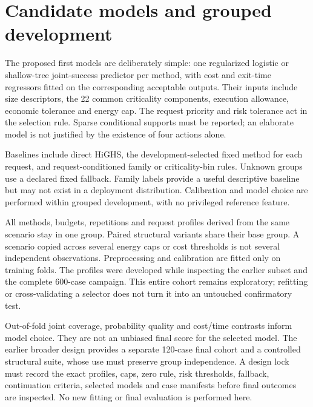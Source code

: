 
\section{Candidate models and grouped development}
The proposed first models are deliberately simple: one regularized logistic
or shallow-tree joint-success predictor per method, with cost and exit-time
regressors fitted on the corresponding acceptable outputs. Their inputs
include size descriptors, the 22 common criticality components, execution
allowance, economic tolerance and energy cap. The request priority and risk
tolerance act in the selection rule. Sparse conditional supports must be
reported; an elaborate model is not justified by the existence of four
actions alone.

Baselines include direct HiGHS, the development-selected fixed method for
each request, and request-conditioned family or criticality-bin rules.
Unknown groups use a declared fixed fallback. Family labels provide a useful
descriptive baseline but may not exist in a deployment distribution.
Calibration and model choice are performed within grouped development,
with no privileged reference feature.

All methods, budgets, repetitions and request profiles derived from the same
scenario stay in one group. Paired structural variants share their base
group. A scenario copied across several energy caps or cost thresholds is
not several independent observations. Preprocessing and calibration are
fitted only on training folds. The profiles were developed while
inspecting the earlier subset and the complete 600-case campaign. This entire
cohort remains exploratory; refitting or cross-validating a selector does not
turn it into an untouched confirmatory test.

Out-of-fold joint coverage, probability quality and cost/time contrasts inform
model choice. They are not an unbiased final score for the selected model.
The earlier broader design provides a separate 120-case final cohort and a
controlled structural suite, whose use must preserve group independence.
A design lock must record the exact profiles, caps, zero rule, risk thresholds,
fallback, continuation criteria, selected models and case manifests before
final outcomes are inspected. No new fitting or final evaluation is performed
here.

